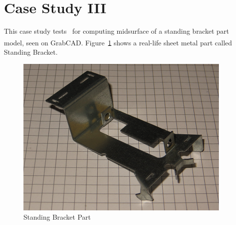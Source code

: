 \section{Case Study III}

			
This case study tests \mysystemname~for computing midsurface of a standing bracket part model, seen on GrabCAD\textsuperscript{\textregistered}\cite{grabcad}. Figure~\ref{fig:results:stdbracketpart} shows a real-life sheet metal part called Standing Bracket.


\begin{figure}[!h]
\centering     %
\includegraphics[width=0.62\linewidth,valign=t]{../Common/images/CommercialBracketReal}
\caption{Standing Bracket Part}
\label{fig:results:stdbracketpart}
\end{figure}


